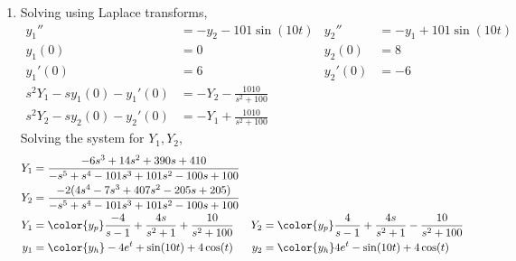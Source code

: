 \begin{enumerate}
    \item Solving using Laplace transforms,
          \begin{align}
              y_1''                       & = -y_2 - 101\sin(10t)           &
              y_2''                       & = -y_1 + 101\sin(10t)             \\
              y_1(0)                      & = 0                             &
              y_2(0)                      & = 8                               \\
              y_1'(0)                     & = 6                             &
              y_2'(0)                     & = -6                              \\
              s^2 Y_1 - sy_1(0) - y_1'(0) & = -Y_2 - \frac{1010}{s^2 + 100}   \\
              s^2 Y_2 - sy_2(0) - y_2'(0) & = -Y_1 + \frac{1010}{s^2 + 100}
          \end{align}
          Solving the system for $ Y_1, Y_2 $,
          \begin{align}
              Y_1                    & = \frac{-6s^3 + 14s^2+390s + 410}
              {-s^5 + s^4 - 101s^3
              + 101s^2 - 100s + 100}                                                \\
              Y_2                    & = \frac{-2(4s^4 - 7s^3 + 407s^2
                  - 205s + 205)}
              {-s^5 + s^4 - 101s^3
              + 101s^2 - 100s + 100}                                                \\
              Y_1                    & = \color{y_p} \frac{-4}{s-1}
              + \frac{4s}{s^2 + 1}
              + \frac{10}{s^2 + 100} &
              Y_2                    & = \color{y_p} \frac{4}{s-1}
              + \frac{4s}{s^2 + 1}
              - \frac{10}{s^2 + 100}                                                \\
              y_1                    & = \color{y_h} -4e^t + \sin(10t) + 4\cos(t) &
              y_2                    & = \color{y_h} 4e^t - \sin(10t) + 4\cos(t)
          \end{align}


\end{enumerate}
